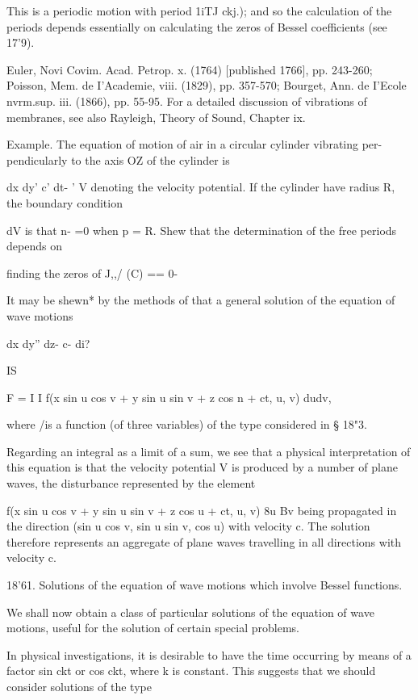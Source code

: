This is a periodic motion with period 1iTJ ckj.); and so the
calculation of the periods depends essentially on calculating the
zeros of Bessel coefficients (see 17'9).

 Euler, Novi Covim. Acad. Petrop. x. (1764) [published 1766], pp.
243-260; Poisson, Mem. de I'Academie, viii. (1829), pp. 357-570;
Bourget, Ann. de I'Ecole nvrm.sup. iii. (1866), pp. 55-95. For a
detailed discussion of vibrations of membranes, see also Rayleigh,
Theory of Sound, Chapter ix.

%
%

Example. The equation of motion of air in a circular cylinder
vibrating per- pendicularly to the axis OZ of the cylinder is

dx dy' c' dt- ' V denoting the velocity potential. If the cylinder
have radius R, the boundary condition

dV is that n- =0 when p = R. Shew that the determination of the free
periods depends on

finding the zeros of J,,/ (C) == 0-

It may be
shewn* by the methods of  that a general solution of the equation
of wave motions

dx dy'' dz- c- di?

IS

F = I I f(x sin u cos v + y sin u sin v + z cos n + ct, u, v) dudv,

where /is a function (of three variables) of the type considered in §
18"3.

Regarding an integral as a limit of a sum, we see that a physical
interpretation of this equation is that the velocity potential V is
produced by a number of plane waves, the disturbance represented by
the element

f(x sin u cos v + y sin u sin v + z cos u + ct, u, v) 8u Bv being
propagated in the direction (sin u cos v, sin u sin v, cos u) with
velocity c. The solution therefore represents an aggregate of plane
waves travelling in all directions with velocity c.

18'61. Solutions of the equation of wave motions which involve Bessel
functions.

We shall now obtain a class of particular solutions of the equation of
wave motions, useful for the solution of certain special problems.

In physical investigations, it is desirable to have the time occurring
by means of a factor sin ckt or cos ckt, where k is constant. This
suggests that we should consider solutions of the type

